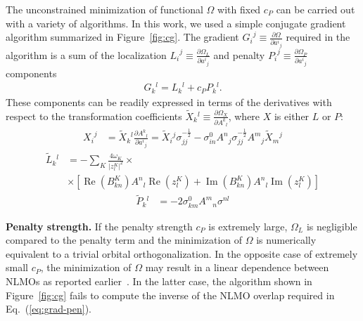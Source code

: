 \documentclass[aps,prl,reprint,amsmath,amssymb]{revtex4-1}
\begin{document}
The unconstrained minimization of functional $\Omega$ with fixed $c_P$ can be carried out with a variety of algorithms. In this work, we used a simple conjugate gradient algorithm summarized in Figure~\ref{fig:cg}. The gradient ${G_i}^j \equiv \frac{\partial \Omega}{\partial {a^i}_j}$  required in the algorithm is a sum of the localization ${L_i}^j \equiv \frac{\partial \Omega_L}{\partial {a^i}_j}$ and penalty ${P_i}^j \equiv \frac{\partial \Omega_P}{\partial {a^i}_j}$ components
%
\begin{equation} \label{eq:grad}
\begin{split}
G{_k}^{l} = L{_k}^{l} + c_P P{_k}^{l}.
\end{split}
\end{equation}
%
These components can be readily expressed in terms of the derivatives with respect to the transformation coefficients $\tilde{X}{_k}^l \equiv \frac{\partial \Omega_X}{\partial {A^k}_l}$, where $X$ is either $L$ or $P$:
%
\begin{equation} \label{eq:grad-convert}
\begin{split}
{X_i}^j & = \tilde{X}{_k}^l \frac{\partial {A^k}_l}{\partial {a^i}_j} = \tilde{X}{_i}^j \sigma_{jj}^{-\frac{1}{2}} - \sigma_{in}^0 {A^n}_j  \sigma_{jj}^{-\frac{1}{2}} {A^m}_j \tilde{X}{_m}^j
\end{split}
\end{equation}
%
\begin{equation} \label{eq:grad-loc}
\begin{split}
\tilde{L}{_k}^l & = - \sum_K \frac{4 \omega_K}{\vert z_{l}^{K} \vert^2} \times \\ 
&\times \left[  \operatorname{Re}(B^{K}_{kn}) {A^{n}}_{l} \operatorname{Re}(z_{l}^{K}) + \operatorname{Im}(B^{K}_{kn}) {A^{n}}_{l} \operatorname{Im}(z_{l}^{K}) \right]
\end{split}
\end{equation}
%
\begin{equation} \label{eq:grad-pen}
\begin{split}
\tilde{P}{_k}^l & = -2 \sigma_{km}^0 {A^m}_n \sigma^{nl} 
\end{split}
\end{equation}
%

\textbf{Penalty strength.} If the penalty strength $c_P$ is extremely large, $\Omega_L$ is negligible compared to the penalty term and the minimization of $\Omega$ is numerically equivalent to a trivial orbital orthogonalization. In the opposite case of extremely small $c_P$, the minimization of $\Omega$ may result in a linear dependence between NLMOs as reported earlier~\cite{cui2010efficient}. %
In the latter case, the algorithm shown in Figure~\ref{fig:cg} fails to compute the inverse of the NLMO overlap required in Eq.~(\ref{eq:grad-pen}). 
\end{document}
